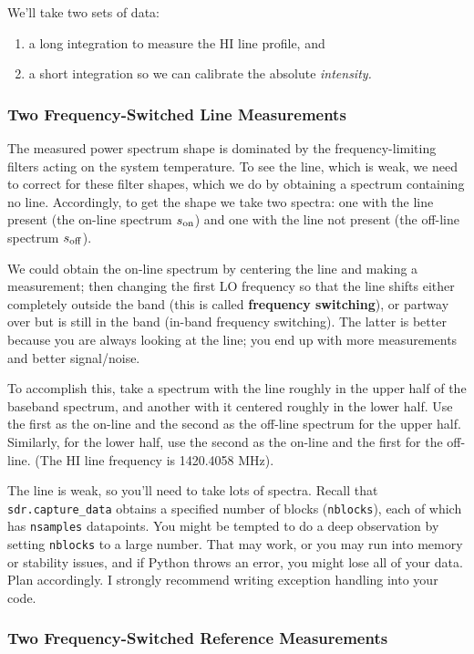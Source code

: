 \documentclass[11pt,preprint]{aastex}
\begin{document}
We'll take two sets of data:
\begin{enumerate}
\item a long integration to measure the HI line profile, and 
\item a short integration so we can calibrate the absolute
{\it intensity.}
\end{enumerate}

\subsubsection{Two Frequency-Switched Line Measurements}

\noindent
The measured power spectrum shape is dominated by the
frequency-limiting filters acting on the system temperature. To see the
line, which is weak, we need to correct for these filter shapes, which
we do by obtaining a spectrum containing no line. Accordingly, to get
the shape we take two spectra: one with the line present (the on-line
spectrum $s_{\rm on}$) and one with the line not present (the off-line
spectrum $s_{\rm off}$).

We could obtain the on-line
  spectrum by centering the line and making a measurement; then changing
  the first LO frequency so that the line shifts either completely
  outside the band (this is called {\bf frequency switching}), or partway
  over but is still in the band (in-band frequency
  switching). The latter is better because you are always looking at
  the line; you end up with more measurements and better signal/noise.

To accomplish this, take a spectrum with the line roughly in the upper
half of the baseband spectrum, and another with it centered roughly in
the lower half. Use the first as the on-line and the second as the
off-line spectrum for the upper half. Similarly, for the lower half,
use the second as the on-line and the first for the off-line.  (The HI
line frequency is 1420.4058 MHz).

The line is weak, so you'll need to take lots of spectra. Recall that
{\tt sdr.capture\_data} obtains a specified number of blocks ({\tt nblocks}),
each of which has {\tt nsamples} datapoints.
You might be tempted
to do a deep observation by setting {\tt nblocks} to a large number. That
may work, or you may run into memory or stability issues, and if Python throws
an error, you might lose all of your data.
Plan accordingly. I strongly recommend writing exception handling into your code.

\subsubsection{Two Frequency-Switched Reference Measurements}
\label{sec:blackbody}
\end{document}
